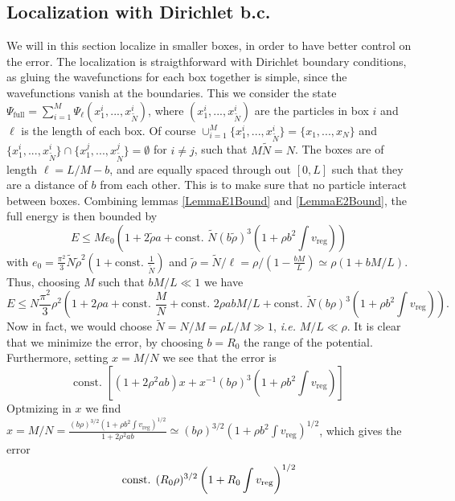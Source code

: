 \documentclass[a4paper,11pt]{article}
\newcommand{\ie}{\emph{i.e.} }
\numberwithin{equation}{section}
\begin{document}
	\subsection{Localization with Dirichlet b.c.}
	We will in this section localize in smaller boxes, in order to have better control on the error. The localization is straigthforward with Dirichlet boundary conditions, as gluing the wavefunctions for each box together is simple, since the wavefunctions vanish at the boundaries. This we consider the state $ \Psi_{\text{full}}=\sum_{i=1}^{M}\Psi_{\ell}(x^i_1,...,x^i_{\tilde{N}}) $, where $ (x_1^i,...,x_{\tilde{N}}^i) $ are the particles in box $ i $ and $ \ell $ is the length of each box. Of course $ \cup_{i=1}^{M}\{x_1^i,...,x_{\tilde{N}}^i\}=\{x_1,...,x_N\} $ and $ \{x_1^i,...,x_{\tilde{N}}^i\}\cap\{x_1^j,...,x_{\tilde{N}}^j\}=\emptyset $ for $ i\neq j $, such that $ M\tilde{N}=N $. The boxes are of length $ \ell=L/M-b $, and are equally spaced through out $ [0,L] $ such that they are a distance of $ b $ from each other. This is to make sure that no particle interact between boxes. Combining lemmas \ref{LemmaE1Bound} and \ref{LemmaE2Bound}, the full energy is then bounded by \begin{equation}
	E\leq M e_0\left(1+2\tilde{\rho} a + \text{const. } \tilde{N} (b\tilde{\rho})^3\left(1+\rho b^2\int v_{\text{reg}}\right)\right)
	\end{equation}
	with $ e_0=\frac{\pi^2}{3}\tilde{N}\tilde{\rho}^2(1+\text{const. }\frac{1}{\tilde{N}}) $ and $ \tilde{\rho}=\tilde{N}/\ell=\rho/(1-\frac{bM}{L})\simeq\rho(1+bM/L) $.
	Thus, choosing $ M $ such that $ bM/L\ll 1 $ we have \begin{equation}
	E\leq N\frac{\pi^2}{3}\rho^2\left(1+2\rho a+\text{const. }\frac{M}{N}+\text{const. }2\rho abM/L+\text{const. }\tilde{N}(b\rho)^3\left(1+\rho b^2\int v_{\text{reg}}\right)\right).
	\end{equation}
	Now in fact, we would choose $ \tilde{N}=N/M=\rho L/M\gg 1 $, \ie $ M/L\ll \rho $. It is clear that we minimize the error, by choosing $ b=R_0 $ the range of the potential. Furthermore, setting $ x=M/N $ we see that the error is \begin{equation}
	\text{const. }\left[(1+2\rho^2 ab)x+x^{-1}(b\rho)^3\left(1+\rho b^2\int v_{\text{reg}}\right)\right]
	\end{equation}
	Optmizing in $ x $ we find $ x=M/N=\frac{(b\rho)^{3/2}\left(1+\rho b^2\int v_{\text{reg}}\right)^{1/2}}{1+2\rho^2 a b}\simeq(b\rho)^{3/2}\left(1+\rho b^2\int v_{\text{reg}}\right)^{1/2} $, which gives the error \begin{equation}
	\text{const. }(R_0\rho)^{3/2}\left(1+R_0 \int v_{\textnormal{reg}}\right)^{1/2}
	\end{equation}
\end{document}
